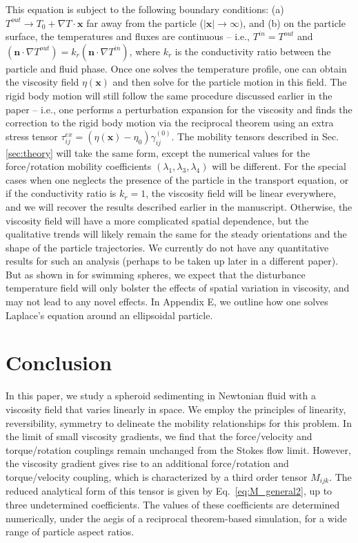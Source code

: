 \documentclass{jfm}
\begin{document}
This equation is subject to the following boundary conditions:  (a) $T^{out} \rightarrow T_0 + \nabla T \cdot \boldsymbol{x}$ far away from the particle ($|\boldsymbol{x}| \rightarrow \infty)$, and (b) on the particle surface, the temperatures and fluxes are continuous – i.e., $T^{in} = T^{out}$ and $\left( \boldsymbol{n} \cdot \nabla T^{out} \right) = k_r \left( \boldsymbol{n} \cdot \nabla T^{in} \right)$, where $k_r$ is the conductivity ratio between the particle and fluid phase.  Once one solves the temperature profile, one can obtain the viscosity field $\eta(\boldsymbol{x})$ and then solve for the particle motion in this field.  The rigid body motion will still follow the same procedure discussed earlier in the paper -- i.e., one performs a perturbation expansion for the viscosity and finds the correction to the rigid body motion via the reciprocal theorem using an extra stress tensor $\tau_{ij}^{ex} = (\eta(\boldsymbol{x}) - \eta_0) \gamma_{ij}^{(0)}$.  The mobility tensors described in Sec. \ref{sec:theory} will take the same form, except the numerical values for the force/rotation mobility coefficients $(\lambda_1, \lambda_3, \lambda_4)$ will be different.  For the special cases when one neglects the presence of the particle in the transport equation, or if the conductivity ratio is $k_r = 1$, the viscosity field will be linear everywhere, and we will recover the results described earlier in the manuscript.  Otherwise, the viscosity field will have a more complicated spatial dependence, but the qualitative trends will likely remain the same for the steady orientations and the shape of the particle trajectories.  We currently do not have any quantitative results for such an analysis (perhaps to be taken up later in a different paper). But as shown in \citep{Vaseem_Elfring_Viscosity} for swimming spheres, we expect that the disturbance temperature field will only bolster the effects of spatial variation in viscosity, and may not lead to any novel effects.  In Appendix E, we outline how one solves Laplace’s equation around an ellipsoidal particle.
 
\section{Conclusion} \label{sec:conclusion}

In this paper, we study a spheroid sedimenting in Newtonian fluid with a viscosity field that varies linearly in space.  We employ the principles of linearity, reversibility, symmetry to delineate the mobility relationships for this problem. In the limit of small viscosity gradients, we find that the force/velocity and torque/rotation couplings remain unchanged from the Stokes flow limit.  However, the viscosity gradient gives rise to an additional force/rotation and torque/velocity coupling, which is characterized by a third order tensor $M_{ijk}$. The reduced analytical form of this tensor is given by Eq.~\eqref{eq:M_general2}, up to three undetermined coefficients. The values of these coefficients are determined numerically, under the aegis of a reciprocal theorem-based simulation, for a wide range of particle aspect ratios.
\end{document}
